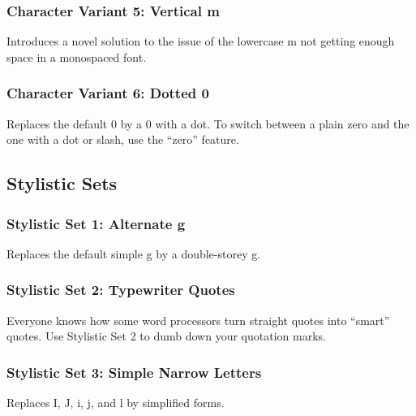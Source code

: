 \subsubsection{Character Variant 5: Vertical m}
Introduces a novel solution to the issue of the lowercase m not getting enough space in a monospaced font.
\begin{quote}
{ \sample}
\end{quote}

\subsubsection{Character Variant 6: Dotted 0}
Replaces the default 0 by a 0 with a dot. To switch between a plain zero and the one with a dot or slash, use the “zero” feature.
\begin{quote}
{ \sample}
\end{quote}

\subsection{Stylistic Sets}

\subsubsection{Stylistic Set 1: Alternate g}
Replaces the default simple g by a double-storey g.
\begin{quote}
{ \sample}
\end{quote}

\subsubsection{Stylistic Set 2: Typewriter Quotes}
Everyone knows how some word processors turn straight quotes into “smart” quotes. Use Stylistic Set 2 to dumb down your quotation marks.
\begin{quote}
{ \sample}
\end{quote}

\subsubsection{Stylistic Set 3: Simple Narrow Letters}
Replaces I, J, i, j, and l by simplified forms.
\begin{quote}
{ \sample}
\end{quote}

